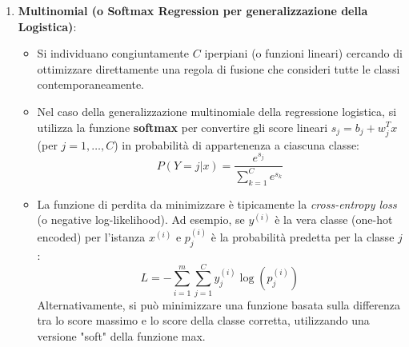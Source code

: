 \documentclass{article}
\begin{document}
\begin{enumerate}
    \item \textbf{Multinomial (o Softmax Regression per generalizzazione della Logistica)}:
          \begin{itemize}
              \item Si individuano congiuntamente $C$ iperpiani (o funzioni lineari) cercando di ottimizzare direttamente una regola di fusione che consideri tutte le classi contemporaneamente.
              \item Nel caso della generalizzazione multinomiale della regressione logistica, si utilizza la funzione \textbf{softmax} per convertire gli score lineari $s_j = b_j + w_j^T x$ (per $j=1,\dots,C$) in probabilità di appartenenza a ciascuna classe:
                    $$ P(Y=j | x) = \frac{e^{s_j}}{\sum_{k=1}^{C} e^{s_k}} $$
              \item La funzione di perdita da minimizzare è tipicamente la \textit{cross-entropy loss} (o negative log-likelihood). Ad esempio, se $y^{(i)}$ è la vera classe (one-hot encoded) per l'istanza $x^{(i)}$ e $p_j^{(i)}$ è la probabilità predetta per la classe $j$:
                    $$ L = - \sum_{i=1}^{m} \sum_{j=1}^{C} y_j^{(i)} \log(p_j^{(i)}) $$
                    Alternativamente, si può minimizzare una funzione basata sulla differenza tra lo score massimo e lo score della classe corretta, utilizzando una versione "soft" della funzione max.
          \end{itemize}
\end{enumerate}
\end{document}
